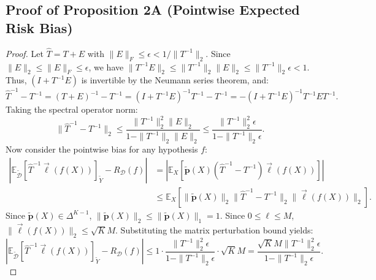 \documentclass[10pt,twocolumn]{article}
\theoremstyle{definition}
\begin{document}
\subsection{Proof of Proposition 2A (Pointwise Expected Risk Bias)}
\begin{proof}
Let $\hat{T} = T + E$ with $\|E\|_F \le \epsilon < 1/\|T^{-1}\|_2$. Since $\|E\|_2 \le \|E\|_F \le \epsilon$, we have $\|T^{-1} E\|_2 \le \|T^{-1}\|_2 \|E\|_2 \le \|T^{-1}\|_2 \epsilon < 1$. Thus, $(I + T^{-1} E)$ is invertible by the Neumann series theorem, and:
\begin{equation}
\hat{T}^{-1} - T^{-1} = (T + E)^{-1} - T^{-1} = (I + T^{-1} E)^{-1} T^{-1} - T^{-1} = - (I + T^{-1} E)^{-1} T^{-1} E T^{-1}.
\end{equation}
Taking the spectral operator norm:
\begin{equation}
\|\hat{T}^{-1} - T^{-1}\|_2 \le \frac{\|T^{-1}\|_2^2 \|E\|_2}{1 - \|T^{-1}\|_2 \|E\|_2} \le \frac{\|T^{-1}\|_2^2 \epsilon}{1 - \|T^{-1}\|_2 \epsilon}.
\end{equation}
Now consider the pointwise bias for any hypothesis $f$:
\begin{align}
\left| \mathbb{E}_{\tilde{\mathcal{D}}} [\hat{T}^{-1} \vec{\ell}(f(X))]_{\tilde{Y}} - R_{\mathcal{D}}(f) \right| &= \left| \mathbb{E}_X \left[ \tilde{\mathbf{p}}(X) (\hat{T}^{-1} - T^{-1}) \vec{\ell}(f(X)) \right] \right| \\
&\le \mathbb{E}_X \left[ \|\tilde{\mathbf{p}}(X)\|_2 \|\hat{T}^{-1} - T^{-1}\|_2 \|\vec{\ell}(f(X))\|_2 \right].
\end{align}
Since $\tilde{\mathbf{p}}(X) \in \Delta^{K-1}$, $\|\tilde{\mathbf{p}}(X)\|_2 \le \|\tilde{\mathbf{p}}(X)\|_1 = 1$. Since $0 \le \ell \le M$, $\|\vec{\ell}(f(X))\|_2 \le \sqrt{K} M$. Substituting the matrix perturbation bound yields:
\begin{equation}
\left| \mathbb{E}_{\tilde{\mathcal{D}}} [\hat{T}^{-1} \vec{\ell}(f(X))]_{\tilde{Y}} - R_{\mathcal{D}}(f) \right| \le 1 \cdot \frac{\|T^{-1}\|_2^2 \epsilon}{1 - \|T^{-1}\|_2 \epsilon} \cdot \sqrt{K} M = \frac{\sqrt{K} M \|T^{-1}\|_2^2 \epsilon}{1 - \|T^{-1}\|_2 \epsilon}.
\end{equation}
\end{proof}
\end{document}

